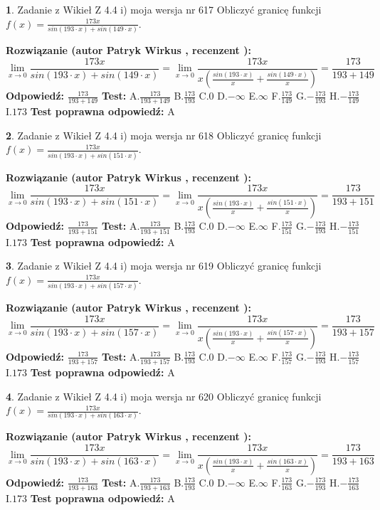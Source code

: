 \documentclass[12pt, a4paper]{article}
\theoremstyle{definition} %
\newtheorem{zad}{}
\newcommand{\zadStart}[1]{\begin{zad}#1\newline}
\newcommand{\zadStop}{\end{zad}}
\newcommand{\rozwStart}[2]{\noindent \textbf{Rozwiązanie (autor #1 , recenzent #2): }\newline}
\newcommand{\rozwStop}{\newline}
\newcommand{\odpStart}{\noindent \textbf{Odpowiedź:}\newline}
\newcommand{\odpStop}{\newline}
\newcommand{\testStart}{\noindent \textbf{Test:}\newline}
\newcommand{\testStop}{\newline}
\newcommand{\kluczStart}{\noindent \textbf{Test poprawna odpowiedź:}\newline}
\newcommand{\kluczStop}{\newline}
\begin{document}
\zadStart{Zadanie z Wikieł Z 4.4 i) moja wersja nr 617}
Obliczyć granicę funkcji $f(x)=\frac{173x}{sin(193\cdot x) +sin(149\cdot x)}$.
\zadStop
\rozwStart{Patryk Wirkus}{}
$$\lim\limits_{x\to 0}\frac{173x}{sin(193\cdot x) +sin(149\cdot x)}=\lim\limits_{x\to 0}\frac{173x}{x(\frac{sin(193\cdot x)}{x}+\frac{sin(149\cdot x)}{x})}=\frac{173}{193+149}$$
\rozwStop
\odpStart
$\frac{173}{193+149}$
\odpStop
\testStart
A.$\frac{173}{193+149}$
B.$\frac{173}{193}$
C.$0$
D.$-\infty$
E.$\infty$
F.$\frac{173}{149}$
G.$-\frac{173}{193}$
H.$-\frac{173}{149}$
I.$173$
\testStop
\kluczStart
A
\kluczStop



\zadStart{Zadanie z Wikieł Z 4.4 i) moja wersja nr 618}
Obliczyć granicę funkcji $f(x)=\frac{173x}{sin(193\cdot x) +sin(151\cdot x)}$.
\zadStop
\rozwStart{Patryk Wirkus}{}
$$\lim\limits_{x\to 0}\frac{173x}{sin(193\cdot x) +sin(151\cdot x)}=\lim\limits_{x\to 0}\frac{173x}{x(\frac{sin(193\cdot x)}{x}+\frac{sin(151\cdot x)}{x})}=\frac{173}{193+151}$$
\rozwStop
\odpStart
$\frac{173}{193+151}$
\odpStop
\testStart
A.$\frac{173}{193+151}$
B.$\frac{173}{193}$
C.$0$
D.$-\infty$
E.$\infty$
F.$\frac{173}{151}$
G.$-\frac{173}{193}$
H.$-\frac{173}{151}$
I.$173$
\testStop
\kluczStart
A
\kluczStop



\zadStart{Zadanie z Wikieł Z 4.4 i) moja wersja nr 619}
Obliczyć granicę funkcji $f(x)=\frac{173x}{sin(193\cdot x) +sin(157\cdot x)}$.
\zadStop
\rozwStart{Patryk Wirkus}{}
$$\lim\limits_{x\to 0}\frac{173x}{sin(193\cdot x) +sin(157\cdot x)}=\lim\limits_{x\to 0}\frac{173x}{x(\frac{sin(193\cdot x)}{x}+\frac{sin(157\cdot x)}{x})}=\frac{173}{193+157}$$
\rozwStop
\odpStart
$\frac{173}{193+157}$
\odpStop
\testStart
A.$\frac{173}{193+157}$
B.$\frac{173}{193}$
C.$0$
D.$-\infty$
E.$\infty$
F.$\frac{173}{157}$
G.$-\frac{173}{193}$
H.$-\frac{173}{157}$
I.$173$
\testStop
\kluczStart
A
\kluczStop



\zadStart{Zadanie z Wikieł Z 4.4 i) moja wersja nr 620}
Obliczyć granicę funkcji $f(x)=\frac{173x}{sin(193\cdot x) +sin(163\cdot x)}$.
\zadStop
\rozwStart{Patryk Wirkus}{}
$$\lim\limits_{x\to 0}\frac{173x}{sin(193\cdot x) +sin(163\cdot x)}=\lim\limits_{x\to 0}\frac{173x}{x(\frac{sin(193\cdot x)}{x}+\frac{sin(163\cdot x)}{x})}=\frac{173}{193+163}$$
\rozwStop
\odpStart
$\frac{173}{193+163}$
\odpStop
\testStart
A.$\frac{173}{193+163}$
B.$\frac{173}{193}$
C.$0$
D.$-\infty$
E.$\infty$
F.$\frac{173}{163}$
G.$-\frac{173}{193}$
H.$-\frac{173}{163}$
I.$173$
\testStop
\kluczStart
A
\kluczStop
\end{document}
